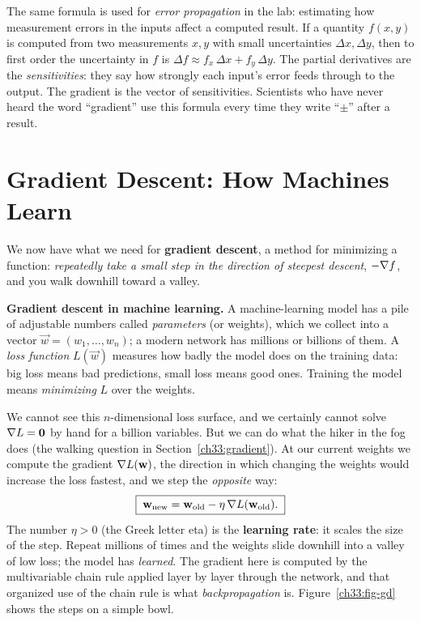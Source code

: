 \begin{connectionbox}
The same formula is used for \emph{error propagation} in the lab: estimating how
measurement errors in the inputs affect a computed result. If a quantity
$f(x,y)$ is computed from two measurements $x,y$ with small uncertainties
$\Delta x,\Delta y$, then to first order the uncertainty in $f$ is
$\Delta f \approx f_x\,\Delta x + f_y\,\Delta y$. The partial derivatives are the
\emph{sensitivities}: they say how strongly each input's error feeds through to
the output. The gradient is the vector of sensitivities. Scientists who have never
heard the word ``gradient'' use this formula every time they write
``$\pm$'' after a result.
\end{connectionbox}

\section{Gradient Descent: How Machines Learn}
\label{ch33:gd}

We now have what we need for \textbf{gradient descent}, a method for minimizing a
function: \emph{repeatedly take a small step in the direction of steepest
descent}, $-\nabla f$, and you walk downhill toward a valley.

\begin{applicationbox}
\textbf{Gradient descent in machine learning.} A machine-learning model has a pile
of adjustable numbers called \emph{parameters} (or weights), which we collect into
a vector $\vec w=(w_1,\dots,w_n)$; a modern network has millions or billions of
them. A \emph{loss function} $L(\vec w)$ measures how badly the model does on the
training data: big loss means bad predictions, small loss means good ones.
Training the model means \emph{minimizing} $L$ over the weights.

We cannot see this $n$-dimensional loss surface, and we certainly cannot solve
$\nabla L = \mathbf{0}$ by hand for a billion variables. But we can do what the
hiker in the fog does (the walking question in Section~\ref{ch33:gradient}). At our
current weights we compute the gradient $\nabla L(\mathbf{w})$, the direction in which
changing the weights would increase the loss fastest, and we step the
\emph{opposite} way:
\[
  \boxed{\;\mathbf{w}_{\text{new}} = \mathbf{w}_{\text{old}} - \eta\,\nabla L(\mathbf{w}_{\text{old}}).\;}
\]
The number $\eta>0$ (the Greek letter eta) is the \textbf{learning rate}: it
scales the size of the step. Repeat millions of times and the weights slide
downhill into a valley of low loss; the model has \emph{learned}. The gradient
here is computed by the multivariable chain rule applied layer by layer through
the network, and that organized use of the chain rule is what
\emph{backpropagation} is. Figure~\ref{ch33:fig-gd} shows the steps on a simple
bowl.
\end{applicationbox}

